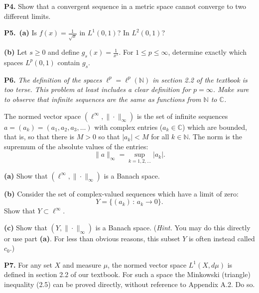 \documentclass[12pt]{amsart}
\newcommand{\CC}{\mathbb{C}}
\newcommand{\NN}{\mathbb{N}}
\newcommand{\prob}[1]{\bigskip\noindent\textbf{#1.}\quad }
\newcommand{\epart}[1]{\medskip\noindent\textbf{(#1)}\quad }
\newcommand{\ppart}[1]{\,\textbf{(#1)}\quad }
\newcommand{\ds}{\displaystyle}
\begin{document}
\prob{P4}  Show that a convergent sequence in a metric space cannot converge to two different limits.

\prob{P5}  \ppart{a}  Is $\ds f(x) = \frac{1}{\sqrt{x}}$ in $L^1(0,1)$?  In $L^2(0,1)$?

\epart{b}  Let $s \ge 0$ and define $\ds g_s(x) = \frac{1}{x^s}$.  For $1\le p \le \infty$, determine exactly which spaces $L^p(0,1)$ contain $g_s$.

\prob{P6}  \emph{The definition of the spaces $\ell^p = \ell^p(\NN)$ in section 2.2 of the textbook is too terse.  This problem at least includes a clear definition for $p=\infty$.  Make sure to observe that infinite sequences are the same as functions from $\NN$ to $\CC$.}

\medskip
\noindent The normed vector space $(\ell^\infty,\|\cdot\|_\infty)$ is the set of infinite sequences $a=(a_k)=(a_1,a_2,a_3,\dots)$ with complex entries ($a_k\in\CC$) which are bounded, that is, so that there is $M>0$ so that $|a_k|<M$ for all $k \in\NN$.  The norm is the supremum of the absolute values of the entries:
	$$\|a\|_\infty = \sup_{k=1,2,\dots} |a_k|.$$

\epart{a}  Show that $(\ell^\infty,\|\cdot\|_\infty)$ is a Banach space.

\epart{b}  Consider the set of complex-valued sequences which have a limit of zero:
	$$Y=\{(a_k)\,:\, a_k \to 0\}.$$
Show that $Y \subset \ell^\infty$.

\epart{c}  Show that $(Y,\|\cdot\|_\infty)$ is a Banach space.  (\emph{Hint.}  You may do this directly or use part \textbf{(a)}.  For less than obvious reasons, this subset $Y$ is often instead called $c_0$.)

\prob{P7}  For any set $X$ and measure $\mu$, the normed vector space $L^1(X,d\mu)$ is defined in section 2.2 of our textbook.  For such a space the Minkowski (triangle) inequality (2.5) can be proved directly, without reference to Appendix A.2.  Do so.
\end{document}
